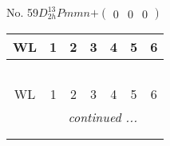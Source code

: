 \documentclass[fleqn,9pt,landscape]{jsarticle}
\begin{document}
\newpage
No. 59\quad$D_{2h}^{13}$\quad$Pmmn$\quad[ orthorhombic ]\quad$+\begin{pmatrix} 0 & 0 & 0 \end{pmatrix}$
\begin{center}
\renewcommand{\arraystretch}{1.2}
\begin{longtable}{ccccccc}
 \hline \hline
WL & 1 & 2 & 3 & 4 & 5 & 6 \\ \hline \endfirsthead

\multicolumn{6}{l}{\tablename\ \thetable{}} \\
 \hline \hline
WL & 1 & 2 & 3 & 4 & 5 & 6 \\ \hline \endhead

 \hline \hline
\multicolumn{6}{r}{\footnotesize\it continued ...} \\ \endfoot

 \hline \hline
\multicolumn{6}{r}{} \\ \endlastfoot


\end{longtable}
\end{center}
\end{document}
